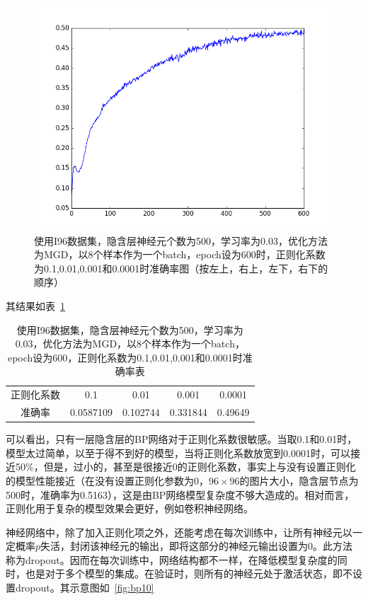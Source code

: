 \begin{figure}[htb]
\includegraphics[scale=0.32]{../figures/Log/BP_new10/BP_new10_acc.png} 
\caption{使用I96数据集，隐含层神经元个数为500，学习率为0.03，优化方法为MGD，以8个样本作为一个batch，epoch设为600时，正则化系数为0.1,0.01,0.001和0.0001时准确率图（按左上，右上，左下，右下的顺序）}
\label{fig:bp9}
\end{figure}

其结果如表~\ref{table:bp2}
\begin{table}[htb]
\centering
\caption{使用I96数据集，隐含层神经元个数为500，学习率为0.03，优化方法为MGD，以8个样本作为一个batch，epoch设为600，正则化系数为0.1,0.01,0.001和0.0001时准确率表}
\begin{tabular}{ccccc}
\toprule[2pt]
正则化系数 & 0.1 & 0.01 & 0.001 & 0.0001 \\ 
准确率 & 0.0587109 & 0.102744 & 0.331844 & 0.49649 \\ 
\bottomrule[2pt]
\end{tabular} 
\label{table:bp2}
\end{table}
可以看出，只有一层隐含层的BP网络对于正则化系数很敏感。当取0.1和0.01时，模型太过简单，以至于得不到好的模型，当将正则化系数放宽到0.0001时，可以接近50\%，但是，过小的，甚至是很接近0的正则化系数，事实上与没有设置正则化的模型性能接近（在没有设置正则化参数为0，$96\times96$的图片大小，隐含层节点为500时，准确率为0.5163），这是由BP网络模型复杂度不够大造成的。相对而言，正则化用于复杂的模型效果会更好，例如卷积神经网络。

神经网络中，除了加入正则化项之外，还能考虑在每次训练中，让所有神经元以一定概率$p$失活，封闭该神经元的输出，即将这部分的神经元输出设置为0。此方法称为dropout。因而在每次训练中，网络结构都不一样，在降低模型复杂度的同时，也是对于多个模型的集成。在验证时，则所有的神经元处于激活状态，即不设置dropout。其示意图如~\ref{fig:bp10}

